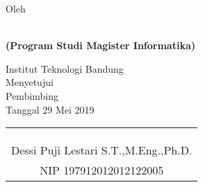\clearpage
\pagestyle{empty}

\begin{center}
\smallskip

    \singlespacing
    \large \bfseries \MakeUppercase{\thetitle}
    \vfill

    \normalsize \normalfont Oleh

    \bfseries \large \theauthor\\
    \normalsize (Program Studi Magister Informatika)

    \normalsize \normalfont Institut Teknologi Bandung \\

    \vfill
    \normalsize \normalfont
    Menyetujui\\
    Pembimbing\\
    \bigskip
    Tanggal 29 Mei 2019

    \setlength{\tabcolsep}{12pt}
    \begin{tabular}{c}
        \\
        \\
        \\
        \\
        Dessi Puji Lestari S.T.,M.Eng.,Ph.D. \\
        NIP 197912012012122005 \\
    \end{tabular}

\end{center}
\clearpage
